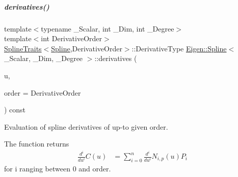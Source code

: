 \mbox{\label{group___splines___module_a50bcf6c99a95ecab7c475f3ab503ee22}} 
\subparagraph{\texorpdfstring{derivatives()}{derivatives()}\hspace{0.1cm}{\footnotesize\ttfamily [3/4]}}
{\footnotesize\ttfamily template$<$typename \+\_\+\+Scalar, int \+\_\+\+Dim, int \+\_\+\+Degree$>$ \\
template$<$int Derivative\+Order$>$ \\
\hyperlink{struct_eigen_1_1_spline_traits}{Spline\+Traits}$<$\hyperlink{group___splines___module_class_eigen_1_1_spline}{Spline},Derivative\+Order$>$\+::Derivative\+Type \hyperlink{group___splines___module_class_eigen_1_1_spline}{Eigen\+::\+Spline}$<$ \+\_\+\+Scalar, \+\_\+\+Dim, \+\_\+\+Degree $>$\+::derivatives (\begin{DoxyParamCaption}\item[{\hyperlink{group___splines___module_a8cafd78b564825c76fbb3419653d9742}{Scalar}}]{u,  }\item[{Dense\+Index}]{order = {\ttfamily DerivativeOrder} }\end{DoxyParamCaption}) const}



Evaluation of spline derivatives of up-\/to given order. 

The function returns \begin{align*} \frac{d^i}{du^i}C(u) & = \sum_{i=0}^{n} \frac{d^i}{du^i} N_{i,p}(u)P_i \end{align*} for i ranging between 0 and order.


